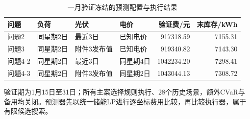 \begin{table}[htbp]\centering\small
\caption{一月验证冻结的预测配置与执行结果}
\label{tab:v2_forecast_selection}
\begin{tabularx}{\linewidth}{LLLLRR}\toprule
问题 & 负荷 & 光伏 & 电价 & 验证费/元 & 末库存/kWh\\\midrule
问题2 & 同星期2日 & 最近3日 & 已知电价 & 917318.59 & 7155.31\\
问题3 & 同星期2日 & 附件3发布值 & 已知电价 & 919340.82 & 7143.30\\
问题4-2 & 同星期2日 & 最近3日 & 同星期4日 & 1042234.20 & 7298.41\\
问题4-3 & 同星期2日 & 附件3发布值 & 同星期2日 & 1043044.13 & 7308.72\\
\bottomrule\end{tabularx}
\par\smallskip\parbox{\linewidth}{\footnotesize 验证期为1月15日至31日；所有主案选择规则执行、28个历史场景，额外CVaR与备用均关闭。预测器先以统一储能LP进行逐坐标费用比较，再比较执行器，属于有限候选搜索。}
\end{table}